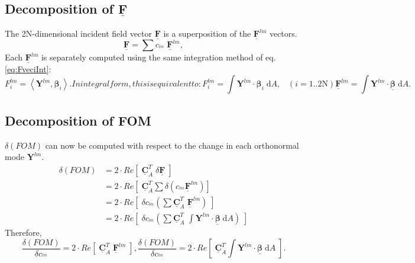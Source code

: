 \documentclass[11pt,letterpaper]{article}
\newcommand{\diff}{\mathrm{d}}
\newcommand{\Cvec}{\underline{\mathbf{C}}}
\newcommand{\Fvec}{\underline{\mathbf{F}}}
\begin{document}
\begin{multicols}{2}
\subsection*{Decomposition of $\Fvec$ }
The 2N-dimensional incident field vector $\Fvec$ is a superposition of the $\Fvec^{lm}$ vectors.
\begin{equation}
\Fvec = \sum c_{^{lm}}\;\Fvec^{lm},
\end{equation}
Each $\Fvec^{lm}$ is separately computed using the same integration method of eq. \ref{eq:FveciInt}:
\begin{subequations}
\begin{equation}
F^{lm}_{i} = \left\langle \mathbf{Y}^{lm},\boldsymbol\beta_{i}\right\rangle.
\end{equation}
In integral form, this is equivalent to: 
\begin{equation}\label{eq:FlmiInt}
\boxed{F^{lm}_{i}= \int \mathbf{Y}^{lm} \cdot \boldsymbol\beta_{i} \; \diff A,\;\;\;(i=1..\text{2N})}
\end{equation}
\begin{equation}\label{eq:FlmInt}
\boxed{\Fvec^{lm}= \int \mathbf{Y}^{lm} \cdot \underline{\boldsymbol\beta} \; \diff A.}
\end{equation}
\end{subequations}

\subsection*{Decomposition of FOM}
$\delta(FOM)$ can now be computed with respect to the change in each orthonormal mode $\mathbf{Y}^{lm}$. 
\begin{align*}
	\delta(FOM) &= 2 \cdot Re\left[\; \Cvec_A^T \;\delta\Fvec\;\right]\\
    &= 2 \cdot Re\left[\; \Cvec_A^T  \sum \delta \left(  c_{^{lm}} \Fvec^{lm}\right) \right]\\	
	&= 2 \cdot Re\left[\; \delta c_{^{lm}}  \left(\sum \Cvec_A^T \;\Fvec^{lm} \right)\;\right] \\
	&= 2 \cdot Re\left[\;\delta 
c_{^{lm}} \left( \sum  \Cvec_A^T\;\int \mathbf{Y}^{lm} \cdot \underline{\boldsymbol\beta} \; \diff A \right) \;\right]
\end{align*}
Therefore, 
\begin{subequations}
\begin{equation}\label{eq:gradFOMgradclmInt}
\frac{\delta(FOM)}{\delta c_{^{lm}} } = 2 \cdot Re\left[\; \Cvec_A^T \;\Fvec^{lm}  \;\right],
\end{equation}
\begin{equation}\label{eq:gradFOMgradclm}
\frac{\delta(FOM)}{\delta c_{^{lm}} } = 2 \cdot Re\left[\; \Cvec_A^T  \int \mathbf{Y}^{lm} \cdot \underline{\boldsymbol\beta} \; \diff A  \;\right].
\end{equation}
\end{subequations}


\end{multicols}
\end{document}
